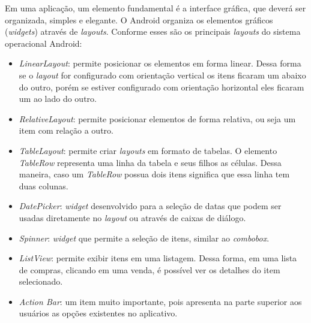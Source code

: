 	
	\par Em uma aplicação, um elemento fundamental é a interface gráfica, que
deverá ser organizada, simples e elegante. O Android organiza os elementos
gráficos (\textit{widgets}) através de \textit{layouts}. Conforme
 esses são os principais \textit{layouts} do sistema
operacional Android:

	\begin{itemize}
	
		 \item \textit{LinearLayout}: permite posicionar os elementos em forma
		 linear. Dessa forma se o \textit{layout} for configurado com orientação
		 vertical os itens ficaram um abaixo do outro, porém se estiver configurado
		 com orientação horizontal eles ficaram um ao lado do outro.
		
		  \item \textit{RelativeLayout}: permite posicionar elementos de forma
		  relativa, ou seja um item com relação a outro.
		
		  \item \textit{TableLayout}: permite criar \textit{layouts} em formato de
		  tabelas. O elemento \textit{TableRow} representa uma linha da tabela e seus
		  filhos as células. Dessa maneira, caso um \textit{TableRow} possua dois
		  itens significa que essa linha tem duas colunas.
		
		  \item \textit{DatePicker}: \textit{widget} desenvolvido para a seleção de
		  datas que podem ser usadas diretamente no \textit{layout} ou através de
		  caixas de diálogo.
	
		  \item \textit{Spinner}: \textit{widget} que permite a seleção de itens,
		  similar ao \textit{combobox}.
		
		  \item \textit{ListView}: permite exibir itens em uma listagem. Dessa
		  forma, em uma lista de compras, clicando em uma venda, é possível ver os
		  detalhes do item selecionado.
		
		  \item \textit{Action Bar}: um item muito importante, pois apresenta na parte
		  superior aos usuários as opções existentes no aplicativo.
		

\end{itemize}

